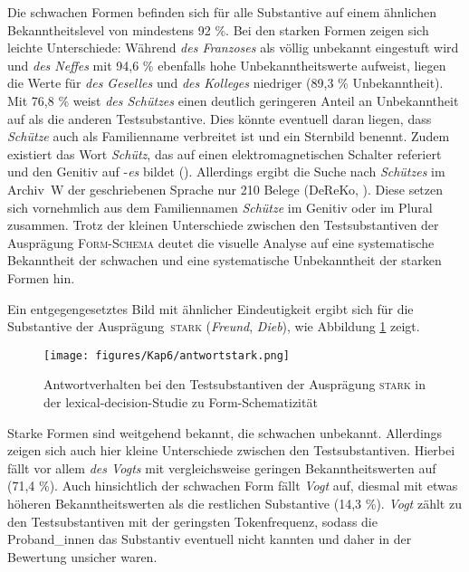 Die schwachen Formen befinden sich für alle Substantive auf einem ähnlichen Bekanntheitslevel von mindestens 92 \%. Bei den starken Formen zeigen sich leichte Unterschiede: Während \textit{des Franzoses} als völlig unbekannt eingestuft wird und \textit{des Neffes} mit 94,6 \% ebenfalls hohe Unbekanntheitswerte aufweist, liegen die Werte für \textit{des Geselles} und \textit{des Kolleges} niedriger (89,3 \% Unbekanntheit). Mit 76,8 \%  weist \textit{des Schützes} einen deutlich geringeren Anteil an Unbekanntheit auf als die anderen Testsubstantive. Dies könnte eventuell daran liegen, dass \textit{Schütze} auch als Familienname verbreitet ist und ein Sternbild benennt. Zudem existiert das Wort \textit{Schütz}, das auf einen elektromagnetischen Schalter referiert und den Genitiv auf -\textit{es} bildet (\cite{Duden.2020}). Allerdings ergibt die Suche nach \textit{Schützes} im Archiv~W der geschriebenen Sprache nur 210 Belege (DeReKo, \cite{LeibnizInstitutfurDeutscheSprache.2019}). Diese setzen sich vornehmlich aus dem Familiennamen \textit{Schütze} im Genitiv oder im Plural zusammen. Trotz der kleinen Unterschiede zwischen den Testsubstantiven der Ausprägung \textsc{Form-Schema} deutet die visuelle Analyse auf eine systematische Bekanntheit der schwachen und eine systematische Unbekanntheit der starken Formen hin. 

Ein entgegengesetztes Bild mit ähnlicher Eindeutigkeit ergibt sich für die Substantive der Ausprägung~\textsc{stark} (\textit{Freund}, \textit{Dieb}), wie Abbildung \ref{schemaantstark} zeigt.
 
\begin{figure}
\texttt{[image: figures/Kap6/antwortstark.png]} 
\caption{Antwortverhalten bei den Testsubstantiven der Ausprägung \textsc{stark} in der lexical-decision-Studie zu Form-Schematizität}
\label{schemaantstark}
\end{figure}

Starke Formen sind weitgehend bekannt, die schwachen unbekannt. Allerdings zeigen sich auch hier kleine Unterschiede zwischen den Testsubstantiven. Hierbei fällt vor allem \textit{des Vogts} mit vergleichsweise geringen Bekanntheitswerten auf (71,4 \%). Auch hinsichtlich der schwachen Form fällt \textit{Vogt} auf, diesmal mit etwas höheren Bekanntheitswerten als die restlichen Substantive (14,3 \%). \textit{Vogt} zählt zu den Testsubstantiven mit der geringsten Tokenfrequenz, sodass die Proband\_innen das Substantiv eventuell nicht kannten und daher in der Bewertung unsicher waren.


